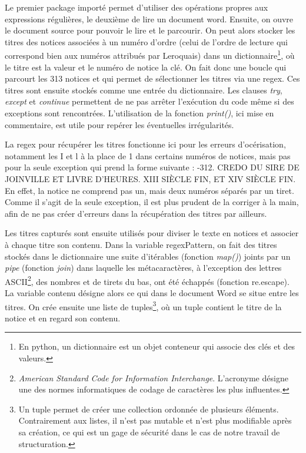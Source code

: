 \documentclass[a4paper,12pt,twoside]{book}
\begin{document}
Le premier package importé permet d'utiliser des opérations propres aux expressions régulières, le deuxième de lire un document word. Ensuite, on ouvre le document source pour pouvoir le lire et le parcourir. On peut alors stocker les titres des notices associées à un numéro d'ordre (celui de l'ordre de lecture qui correspond bien aux numéros attribués par Leroquais) dans un dictionnaire\footnote{En python, un dictionnaire est un objet conteneur qui associe des clés et des valeurs.}, où le titre est la valeur et le numéro de notice la clé. On fait donc une boucle qui parcourt les 313 notices et qui permet de sélectionner les titres via une regex. Ces titres sont ensuite stockés comme une entrée du dictionnaire. Les clauses \og \textit{try}\fg{}, \og \textit{except}\fg{} et \og \textit{continue}\fg{} permettent de ne pas arrêter l'exécution du code même si des exceptions sont rencontrées. L'utilisation de la fonction \textit{print()}, ici mise en commentaire, est utile pour repérer les éventuelles irrégularités.

La regex pour récupérer les titres fonctionne ici pour les erreurs d’océrisation, notamment les \og I\fg{} et \og l\fg{} à la place de 1 dans certains numéros de notices, mais pas pour la seule exception qui prend la forme suivante : -312. CREDO DU SIRE DE JOINVILLE ET LIVRE D’HEURES. XIII SIÈCLE FIN, ET XIV SIÈCLE FIN\fg{}. En effet, la notice ne comprend pas un, mais deux numéros séparés par un tiret. Comme il s’agit de la seule exception, il est plus prudent de la corriger à la main, afin de ne pas créer d’erreurs dans la récupération des titres par ailleurs. 

Les titres capturés sont ensuite utilisés pour diviser le texte en notices et associer à chaque titre son contenu. Dans la variable \og regexPattern\fg{}, on fait des titres stockés dans le dictionnaire une suite d'itérables (fonction\textit{ map()}) joints par un \textit{pipe} (fonction \textit{join}) dans laquelle les métacaractères, à l'exception des lettres ASCII\footnote{\textit{American Standard Code for Information Interchange}. L'acronyme désigne une des normes informatiques de codage de caractères les plus influentes.}, des nombres et de tirets du bas, ont été échappés (fonction re.escape). La variable contenu désigne alors ce qui dans le document Word se situe entre les titres. 
On crée ensuite une liste de tuples\footnote{Un tuple permet de créer une collection ordonnée de plusieurs éléments. Contrairement aux listes, il n'est pas mutable et n'est plus modifiable après sa création, ce qui est un gage de sécurité dans le cas de notre travail de structuration.}, où un tuple contient le titre de la notice et en regard son contenu. 
\end{document}
